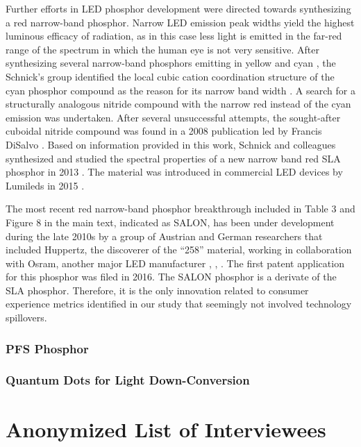 \documentclass[10pt]{article}
\begin{document}
Further efforts in LED phosphor development were directed towards synthesizing a red narrow-band phosphor. Narrow LED emission peak widths yield the highest luminous efficacy of radiation, as in this case less light is emitted in the far-red range of the spectrum in which the human eye is not very sensitive. After synthesizing several narrow-band phosphors emitting in yellow \cite{Hppe2004} and cyan \cite{Kechele2009}, the Schnick’s group identified the local cubic cation coordination structure of the cyan phosphor compound as the reason for its narrow band width \cite{lumi2016narrow}. A search for a structurally analogous nitride compound with the narrow red instead of the cyan emission was undertaken. After several unsuccessful attempts, the sought-after cuboidal nitride compound was found in a 2008 publication led by Francis DiSalvo \cite{Park2008Sr}. Based on information provided in this work, Schnick and colleagues synthesized and studied the spectral properties of a new narrow band red SLA phosphor in 2013 \cite{schmidt2013new}\cite{Pust2014}\cite{schmidt2017phosphors}. The material was introduced in commercial LED devices by Lumileds in 2015 \cite{lumi2016narrow_whitepaper}. 

The most recent red narrow-band phosphor breakthrough included in Table 3 and Figure 8 in the main text, indicated as SALON, has been under development during the late 2010s by a group of Austrian and German researchers that included Huppertz, the discoverer of the “258” material, working in collaboration with Osram, another major LED manufacturer \cite{seibald2019phosphor}, \cite{Hoerder2019} , \cite{Hoerder2020}. The first patent application for this phosphor was filed in 2016. The SALON phosphor is a derivate of the SLA phosphor. Therefore, it is the only innovation related to consumer experience metrics identified in our study that seemingly not involved technology spillovers.

\subsubsection{PFS Phosphor}

\subsubsection{Quantum Dots for Light Down-Conversion}



\section{Anonymized List of Interviewees}
\end{document}
